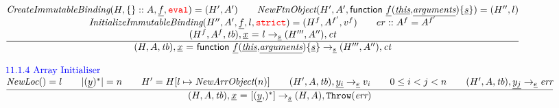 \documentclass[a4paper, leqno]{amsart}
\newcommand{\rulesep}{\quad\quad}
\newcommand{\stmt}{s}
\newcommand{\expr}{e}
\newcommand{\ir}[1]{\ensuremath{\underline{#1}}}
\newcommand{\irid}{\ir{x}}
\newcommand{\mkst}[2]{#1::#2}
\def\inred{\color{red}}
\def\inblue{\color{blue}}
\newcommand{\strict}{{\inred\tt strict}}
\newcommand{\eval}{{\inred\tt eval}}
\newcommand{\tb}{\emph{tb}}
\newcommand{\err}{\emph{err}}
\newcommand{\ct}{\emph{ct}}
\newcommand{\hf}[1]{\emph{#1}}
\newcommand{\error}{\ensuremath{{\tt Throw}(\err)}}
\newcommand{\state}{\ensuremath{(H,A,\tb)}}
\newcommand{\res}{\ensuremath{(H,A)}}
\newcommand{\resp}{\ensuremath{(H',A')}}
\newcommand{\irarr}{\ensuremath{\irid \ {\tt =} \ {\tt[} (\ir
{y}{\tt,})^* {\tt]}}}
\newcommand{\irfv}{\ensuremath{{\sf function} \ \ir{f} {\tt(}\ir{\emph{this}}{\tt,}\ir{\emph{arguments}}{\tt) \{} \ir\stmt {\tt\}}}}
\newcommand{\irfunexpr}{\ensuremath{\irid \ {\tt =} \ \irfv}}
\def\inred{\color{red}}
\def\inblue{\color{blue}}
\begin{document}
\[\begin{array}{l@{~~}l@{~~}ll}
\frac{\begin{matrix}
\hf{CreateImmutableBinding}(H, \{\}::A, \ir{f}, \eval) = \resp
\rulesep
\hf{NewFtnObject}(H',A',\irfv) = (H'', l)
\\
\hf{InitializeImmutableBinding}(H'', A', \ir{f}, l, \strict) = (H^f, A^{f'}, v^f)%
\rulesep
er::A^f = A^{f'}
\\
(H^f,A^f,\tb), \irid \ {\tt =} \ l \rightarrow_{\ir\stmt} (H''',A''), \ct
\end{matrix}}{\begin{matrix}
\state, \irfunexpr \rightarrow_{\ir\stmt} (H''',A''), \ct
\end{matrix}}
\\\\




\mbox{\inblue 11.1.4 Array Initialiser}\\
\frac{\begin{matrix}
\hf{NewLoc}() = l
\rulesep
|(\ir{y})^*| = n
\rulesep
H' = H[l \mapsto \hf{NewArrObject}(n)]
\rulesep
(H',A,\tb), \ir{y_i} \rightarrow_{\ir\expr} v_i
\rulesep
0 \le i < j < n
\rulesep
(H', A, \tb), \ir{y_j} \rightarrow_{\ir{\expr}} \err
\end{matrix}}{\begin{matrix}
\state, \irarr \rightarrow_{\ir\stmt} \res, {\tt Throw}(\err)
\end{matrix}}
\\\\


\end{array}\]
\end{document}
